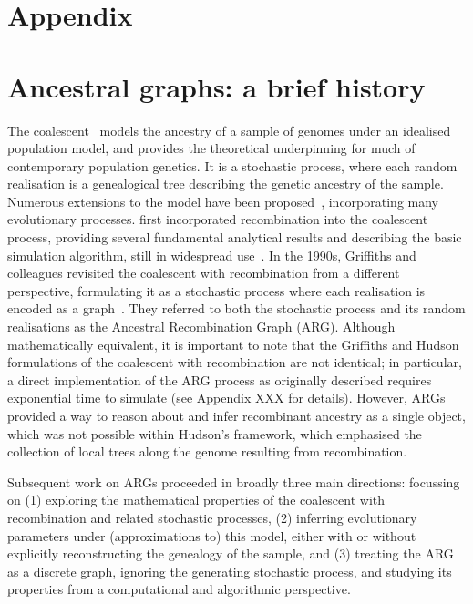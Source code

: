 \documentclass{article}
\begin{document}



\setcounter{secnumdepth}{2} %

\section*{Appendix}
\appendix

\section{Ancestral graphs: a brief history}
\label{sec-arg-history}
The coalescent~\citep{kingman1982coalescent,kingman1982genealogy,
hudson1983testing, tajima1983evolutionary} models the ancestry of a sample of
genomes under an idealised population model, and provides the theoretical
underpinning for much of contemporary population genetics.
It is a stochastic process, where each random realisation
is a genealogical tree describing the genetic ancestry of the sample.
Numerous extensions to the model have been
proposed~\citep{hudson1990gene,hein2004gene,wakely2008coalescent},
incorporating many evolutionary processes.
\citet{hudson1983properties}
first incorporated recombination into the coalescent process,
providing several fundamental analytical results
and describing the basic simulation algorithm, still in
widespread use~\citep{hudson2002generating,kelleher2016efficient,
baumdicker2021efficient}.
In the 1990s, Griffiths and colleagues revisited the
coalescent with recombination from a different perspective,
formulating it as a stochastic process where each realisation
is encoded as a graph~\citep{griffiths1991two,ethier1990two,
griffiths1996ancestral,griffiths1997ancestral}.
They referred to both the stochastic process and
its random realisations as the Ancestral Recombination Graph (ARG).
Although mathematically equivalent, it is
important to note that the Griffiths and Hudson formulations of
the coalescent with recombination are not identical;
in particular, a direct implementation of the ARG process
as originally described requires exponential time to simulate
(see Appendix XXX for details). However, ARGs provided a way
to reason about and infer recombinant ancestry as a single object,
which was not possible within Hudson's framework, which emphasised
the collection of local trees along the genome resulting from recombination.

Subsequent work on ARGs proceeded in broadly three main directions: focussing on (1)
exploring the mathematical properties of the coalescent with recombination and
related stochastic processes, (2) inferring evolutionary parameters under
(approximations to) this model, either with or without explicitly reconstructing the
genealogy of the sample, and (3) treating the ARG as a discrete graph, ignoring the
generating stochastic process, and studying its properties from a computational and
algorithmic perspective.
\end{document}
